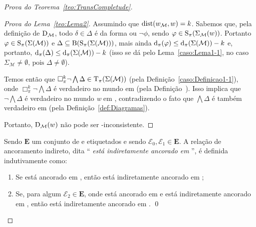 \begin{apendicesenv}
\begin{proof}[Prova do Teorema~\ref{teo:TransCompletude}]
\begin{proof}[Prova do Lema~\ref{teo:Lema2}]
                Assumindo que \(\operatorname{dist}(w_{\mathcal{M}}, w) = k\). Sabemos que, pela definição de \(\operatorname{D}_{\mathcal{M}}\), todo \(\delta \in \Delta\)
                é da forma \PHI ou \(\neg \phi\), sendo \(\varphi \in \operatorname{S}_{\pi}(\Sigma_{\mathcal{M}}(w))\).
                Portanto \(\varphi \in \operatorname{S}_{\pi}(\Sigma(\mathcal{M}))\) e \(\Delta \subseteq \operatorname{B}(\operatorname{S}_{\pi}(\Sigma(\mathcal{M})))\),
                mais ainda \(\operatorname{d}_{\pi}(\varphi) \leq \operatorname{d}_{\pi}(\Sigma(\mathcal{M})) - k\) e, portanto, \(\operatorname{d}_{\pi}(\Delta) \leq \operatorname{d}_{\pi}(\Sigma(\mathcal{M})) - k\)
                (isso se dá pelo Lema~\ref{caso:Lema1-1}, no caso \(\Sigma_{\mathcal{M}} \neq \emptyset \text{, pois } \Delta \neq \emptyset\)).

                Temos então que \(\Box^{k}_{\pi} \neg \bigwedge \Delta \in \operatorname{T}_{\pi}(\Sigma(\mathcal{M}))\) (pela Definição~\ref{caso:Definicao1-1}),
                onde \(\Box^{k}_{\pi} \neg \bigwedge \Delta\) é verdadeiro no mundo \Mundobase em 
                (pela Definição~). Isso implica que \(\neg \bigwedge \Delta\) é verdadeiro no mundo \textit{w}
                em , contradizendo o fato que \(\bigwedge \Delta\) é também verdadeiro em  (pela Definição~\ref{def:Diagramas}).

                Portanto, \(\operatorname{D}_{\mathcal{M}}(w)\) não pode ser -inconsistente.
            \end{proof}

            \begin{definicao}
                \label{def:AncoramenteoInidireto}
                Sendo \(\mathbf{E}\) um conjunto de \PImodelos e \OPImodelos etiquetados e sendo \(\mathcal{E}_{0}, \mathcal{E}_{1} \in \mathbf{E}\). A relação de ancoramento indireto,
                dita ``\textit{ está indiretamente ancorado em }'', é definida indutivamente como:
                \begin{enumerate}[label=\textnormal{\ref{def:AncoramenteoInidireto}.\arabic*}]
                    \item Se  está ancorado em , então  está indiretamente ancorado em ;

                    \item Se, para algum \(\mathcal{E}_{2} \in \mathbf{E}\), onde  está ancorado em  e  está indiretamente ancorado
                        em , então  está indiretamente ancorado em . \qed
                \end{enumerate}
            \end{definicao}


\end{proof}
\end{apendicesenv}

